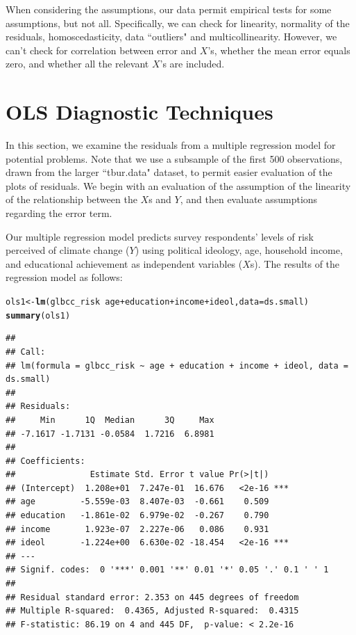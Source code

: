 \documentclass[11pt,openany]{book}
\makeatletter
\newcommand{\hlopt}[1]{\textcolor[rgb]{0,0,0}{#1}}%
\newcommand{\hlstd}[1]{\textcolor[rgb]{0.345,0.345,0.345}{#1}}%
\newcommand{\hlkwb}[1]{\textcolor[rgb]{0.69,0.353,0.396}{#1}}%
\newcommand{\hlkwc}[1]{\textcolor[rgb]{0.333,0.667,0.333}{#1}}%
\newcommand{\hlkwd}[1]{\textcolor[rgb]{0.737,0.353,0.396}{\textbf{#1}}}%
\newenvironment{kframe}{%
 \def\at@end@of@kframe{}%
 \ifinner\ifhmode%
  \def\at@end@of@kframe{\end{minipage}}%
  \begin{minipage}{\columnwidth}%
 \fi\fi%
 \def\FrameCommand##1{\hskip\@totalleftmargin \hskip-\fboxsep
 \colorbox{shadecolor}{##1}\hskip-\fboxsep
     \hskip-\linewidth \hskip-\@totalleftmargin \hskip\columnwidth}%
 \MakeFramed {\advance\hsize-\width
   \@totalleftmargin\z@ \linewidth\hsize
   \@setminipage}}%
 {\par\unskip\endMakeFramed%
 \at@end@of@kframe}
\newenvironment{knitrout}{}{} %
\renewenvironment{knitrout}{\begin{singlespace}}{\end{singlespace}}
\makeatother
\begin{document}
When considering the assumptions, our data permit empirical tests for some assumptions, but not all. Specifically, we can check for linearity, normality of the residuals, homoscedasticity, data ``outliers" and multicollinearity. However, we can't check for correlation between error and $X$'s, whether the mean error equals zero, and whether all the relevant $X$'s  are included. 

\section{OLS Diagnostic Techniques}

In this section, we examine the residuals from a multiple regression model for potential problems. Note that we use a subsample of the first 500 observations, drawn from the larger ``tbur.data" dataset, to permit easier evaluation of the plots of residuals. We begin with an evaluation of the assumption of the linearity of the relationship between the $X$s and $Y$, and then evaluate assumptions regarding the error term. 

Our multiple regression model predicts survey respondents' levels of risk perceived of climate change ($Y$) using political ideology, age, household income,  and educational achievement as independent variables ($X$s). The results of the regression model as follows:

\begin{knitrout}
\color{fgcolor}\begin{kframe}
\begin{alltt}
\hlstd{ols1} \hlkwb{<-}  \hlkwd{lm}\hlstd{(glbcc_risk} \hlopt{~} \hlstd{age} \hlopt{+} \hlstd{education} \hlopt{+} \hlstd{income} \hlopt{+} \hlstd{ideol,} \hlkwc{data} \hlstd{= ds.small)}
\hlkwd{summary}\hlstd{(ols1)}
\end{alltt}
\begin{verbatim}
## 
## Call:
## lm(formula = glbcc_risk ~ age + education + income + ideol, data = ds.small)
## 
## Residuals:
##     Min      1Q  Median      3Q     Max 
## -7.1617 -1.7131 -0.0584  1.7216  6.8981 
## 
## Coefficients:
##               Estimate Std. Error t value Pr(>|t|)    
## (Intercept)  1.208e+01  7.247e-01  16.676   <2e-16 ***
## age         -5.559e-03  8.407e-03  -0.661    0.509    
## education   -1.861e-02  6.979e-02  -0.267    0.790    
## income       1.923e-07  2.227e-06   0.086    0.931    
## ideol       -1.224e+00  6.630e-02 -18.454   <2e-16 ***
## ---
## Signif. codes:  0 '***' 0.001 '**' 0.01 '*' 0.05 '.' 0.1 ' ' 1
## 
## Residual standard error: 2.353 on 445 degrees of freedom
## Multiple R-squared:  0.4365,	Adjusted R-squared:  0.4315 
## F-statistic: 86.19 on 4 and 445 DF,  p-value: < 2.2e-16
\end{verbatim}
\end{kframe}
\end{knitrout}
\end{document}
